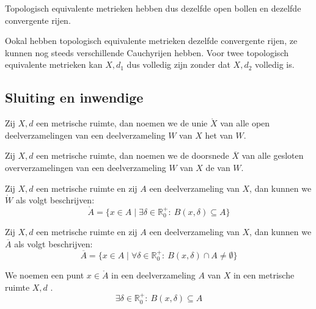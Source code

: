 \documentclass[main.tex]{subfiles}
\begin{document}
\begin{opm}
  Topologisch equivalente metrieken hebben dus dezelfde open bollen en dezelfde convergente rijen.
\end{opm}

\begin{opm}
  Ookal hebben topologisch equivalente metrieken dezelfde convergente rijen, ze kunnen nog steeds verschillende Cauchyrijen hebben.
  Voor twee topologisch equivalente metrieken kan $X,d_{1}$ dus volledig zijn zonder dat $X,d_{2}$ volledig is.
\end{opm}

\subsection{Sluiting en inwendige}
\label{sec:sluit-en-inwend}

\begin{de}
  Zij $X,d$ een metrische ruimte, dan noemen we de unie $\mathring{X}$ van alle open deelverzamelingen van een deelverzameling $W$ van $X$ het  van $W$.
\end{de}

\begin{de}
  Zij $X,d$ een metrische ruimte, dan noemen we de doorsnede $\overline{X}$ van alle gesloten oververzamelingen van een deelverzameling $W$ van $X$ de  van $W$.
\end{de}

\begin{pr}
  Zij $X,d$ een metrische ruimte en zij $A$ een deelverzameling van $X$, dan kunnen we $\mathring{W}$ als volgt beschrijven:
  \[ \mathring{A} = \{ x \in A \mid \exists \delta \in \mathbb{R}_{0}^{+}:\ B(x,\delta) \subseteq A \} \]
\end{pr}

\begin{pr}
  Zij $X,d$ een metrische ruimte en zij $A$ een deelverzameling van $X$, dan kunnen we $\overline{A}$ als volgt beschrijven:
  \[ \overline{A} = \{ x\in A \mid \forall \delta \in \mathbb{R}_{0}^{+}:\ B(x,\delta) \cap A \neq \emptyset \} \]
\end{pr}

\begin{de}
  We noemen een punt $x\in \mathring{A}$ in een deelverzameling $A$ van $X$ in een metrische ruimte $X,d$ .
  \[ \exists \delta \in \mathbb{R}_{0}^{+}:\ B(x,\delta) \subseteq A \]
\end{de}
\end{document}
